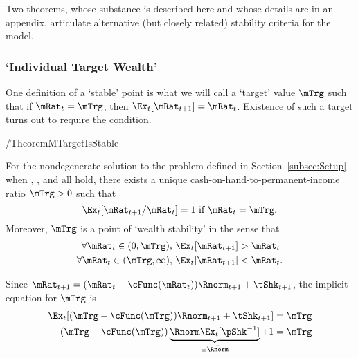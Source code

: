 \documentclass[ProjectDLO]{subfiles}
\begin{document}
Two theorems, whose substance is described here and whose details are in an appendix, articulate alternative (but closely related) stability criteria for the model.

\subsubsection{`Individual Target Wealth'}\label{subsubsec:mTarget}
One definition of a `stable' point is what we will call a `target' value $\mTrg$ such that if $\mRat_{t}=\mTrg$, then $\Ex_{t}[\mRat_{t+1}]=\mRat_{t}$.  Existence of such a target turns out to require the {\GICNrm} condition.

\begin{verbatimwrite}{\EqDir/TheoremMTargetIsStable}
\begin{theorem}\label{thm:target}
  For the nondegenerate solution to the problem defined in Section~\ref{subsec:Setup} when {\FVAC}, {\WRIC}, and {\GICNrm} all hold, there exists a unique cash-on-hand-to-permanent-income ratio $\mTrg>0$ such that
  \begin{equation}
    \Ex_t [{\mRat}_{t+1}/\mRat_t] = 1 \mbox{~if~} \mRat_t = \mTrg.
    \label{eq:mTarget}
  \end{equation}
  Moreover, $\mTrg$ is a point of `wealth stability' in the sense that
  \begin{align}\label{eq:stability}
    \forall {\mRat}_t\in(0,\mTrg),      \,\,& \Ex_t [{\mRat}_{t+1}] > {\mRat}_t  \\
    \forall {\mRat}_t\in(\mTrg,\infty), \,\,& \Ex_t [{\mRat}_{t+1}] < {\mRat}_t. \notag
  \end{align}
  \end{theorem}
\end{verbatimwrite}


 \hypertarget{mTargImplicit}{}

 Since $\mRat_{t+1}=(\mRat_{t}-\cFunc(\mRat_{t}))\Rnorm_{t+1}+\tShk_{t+1}$, the implicit equation for $\mTrg$ is
 \begin{align}
  \Ex_{t}[(\mTrg-\cFunc(\mTrg))\Rnorm_{t+1}+\tShk_{t+1}] & = \mTrg \label{eq:mTargImplicit}
\\   (\mTrg-\cFunc(\mTrg))\underbrace{\Rnorm\Ex_{t}[\pShk^{-1}]}_{\equiv \bar{\Rnorm}}+1 & = \mTrg \notag
 \end{align}
\end{document}

